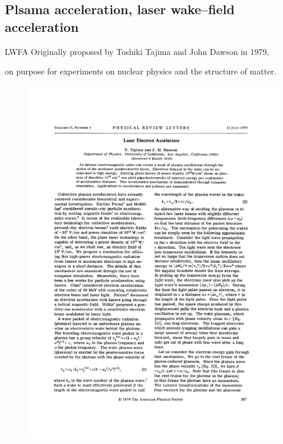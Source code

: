 \documentclass[final]{beamer}
\begin{document}
  \subsection{Plsama acceleration, laser wake--field acceleration}
  \begin{frame}{LWFA}
  Originally proposed by Toshiki Tajima and John Dawson in 1979,
  
  on purpose for experiments on nuclear physics and the structure of matter.
  \begin{figure}
    \includegraphics[height=0.7\textheight]{figures/PhysRevLett.43.267.pdf}
  \end{figure}
  \end{frame}
\end{document}
